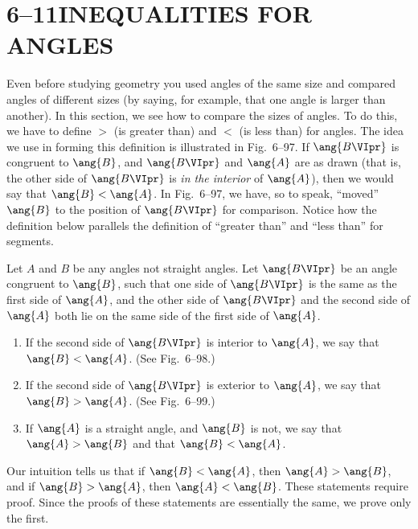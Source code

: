 \documentclass[11pt]{book}
\theoremstyle{bkplain}
\theoremstyle{XIplainnote}
\theoremstyle{bkplain}
\theoremstyle{bkplain}
\begin{document}
\section*{6--11\quad INEQUALITIES FOR ANGLES}

Even before studying geometry you used angles of the same size and compared
angles of different sizes (by saying, for example, that one angle is larger
than another). In this section, we see how to compare the sizes of angles. To
do this, we have to define $>$ (is greater than) and $<$ (is less than) for
angles. The idea we use in forming this definition is illustrated in
Fig.~6--97. If $\ang{B\VIpr}$ is congruent to $\ang{B}$, and $\ang{B\VIpr}$ and
$\ang{A}$ are as drawn (that is, the other side of $\ang{B\VIpr}$ is \emph{in
the interior} of $\ang{A}$), then we would say that $\ang{B} < \ang{A}$. In
Fig.~6--97, we have, so to speak, ``moved'' $\ang{B}$ to the position of
$\ang{B\VIpr}$ for comparison. Notice how the definition below parallels the
definition of ``greater than'' and ``less than'' for segments.

\FIGVININETYSEVEN

\begin{definition}
Let $A$ and $B$ be any angles not straight angles. Let $\ang{B\VIpr}$ be an
angle congruent to $\ang{B}$, such that one side of $\ang{B\VIpr}$ is the same
as the first side of $\ang{A}$, and the other side of $\ang{B\VIpr}$ and the
second side of $\ang{A}$ both lie on the same side of the first side of
$\ang{A}$.
\begin{enumerate}[label=(\alph*), leftmargin=2.2em, itemsep=2pt, topsep=3pt]
\item If the second side of $\ang{B\VIpr}$ is interior to $\ang{A}$, we say
  that $\ang{B} < \ang{A}$. (See Fig.~6--98.)
\item If the second side of $\ang{B\VIpr}$ is exterior to $\ang{A}$, we say
  that $\ang{B} > \ang{A}$. (See Fig.~6--99.)
\item If $\ang{A}$ is a straight angle, and $\ang{B}$ is not, we say that
  $\ang{A} > \ang{B}$ and that $\ang{B} < \ang{A}$.
\end{enumerate}
\end{definition}

\FIGVININETYEIGHTNINETYNINE

Our intuition tells us that if $\ang{B} < \ang{A}$, then $\ang{A} > \ang{B}$,
and if $\ang{B} > \ang{A}$, then $\ang{A} < \ang{B}$. These statements require
proof. Since the proofs of these statements are essentially the same, we prove
only the first.
\end{document}
